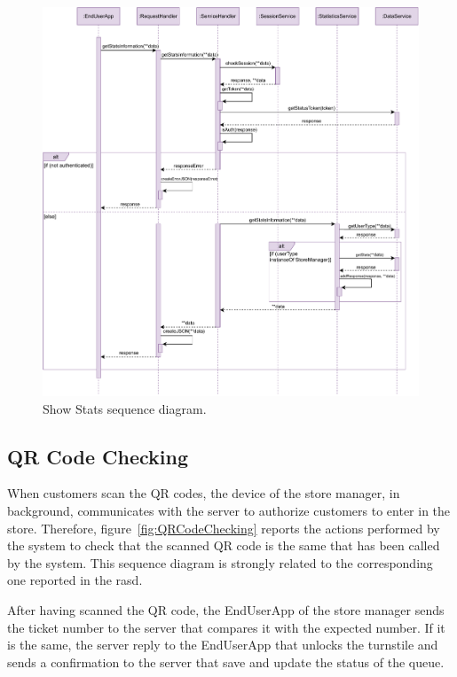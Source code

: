 \begin{figure}[H]
    \centering
    \includegraphics[width=1.0\textwidth]{images/showStats_sequence_diagram.pdf}
    \caption{Show Stats sequence diagram.}\label{fig:ShowStats}
\end{figure}

\subsection{QR Code Checking}

When customers scan the QR codes, the device of the store manager, in background, communicates with the server to authorize customers to enter in the store. Therefore, figure~\ref{fig:QRCodeChecking} reports the actions performed by the system to check that the scanned QR code is the same that has been called by the system.
This sequence diagram is strongly related to the corresponding one reported in the \gls{rasd}.

After having scanned the QR code, the EndUserApp of the store manager sends the ticket number to the server that compares it with the expected number.
If it is the same, the server reply to the EndUserApp that unlocks the turnstile and sends a confirmation to the server that save and update the status of the queue.

